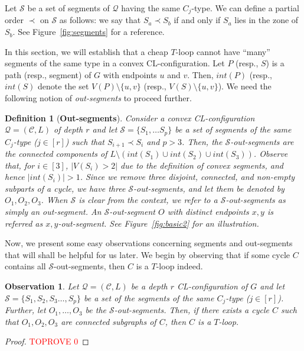 \documentclass{article}
\newtheorem{observation}[theorem]{Observation}
\newtheorem{definition}[theorem]{Definition}
\numberwithin{claimcounter}{lemma}
\begin{document}
Let $\mathcal{S}$ be a set of segments of $\mathcal{Q}$ having the same $C_j$-type. We can define a partial order $\prec$ on $\mathcal{S}$ as follows: we say that $S_a \prec S_b $ if and only if $S_a$ lies in the zone of $S_b$. See Figure~\ref{fig:segments} for a reference. 




In this section, we will establish that a cheap $T$-loop cannot have ``many'' segments of the same type in a convex CL-configuration. Let $P$ (resp., $S$) is a path (resp., segment) of $G$ with endpoints $u$ and $v$. Then, $int(P)$ (resp., $int(S)$ denote the set $V(P)\setminus\{u,v\}$ (resp., $V(S)\setminus \{u,v\}$). We need the following notion of \textit{out-segments} to proceed further.

 



\begin{definition}[{\bf Out-segments}]\label{D:OS}
    Consider a convex CL-configuration $\mathcal{Q}=(\mathcal{C},L)$ of depth $r$ and let $\mathcal{S} = \{S_1,\ldots S_p\}$ be a set of segments of the same $C_j$-type ($j\in [r]$) such that $S_{i+1} \prec S_i$ and $p >3$.  Then, the $\mathcal{S}$-out-segments are the connected components of $L\setminus(int(S_1)\cup int(S_2) \cup int(S_3))$. Observe that, for $i\in [3]$, $|V(S_i)>2|$ due to the definition of convex segments, and hence $|int(S_i)|>1$. Since we remove three disjoint, connected, and non-empty subparts of a cycle, we have three $\mathcal{S}$-out-segments, and let them be denoted by $O_1,O_2,O_3$. When $\mathcal{S}$ is clear from the context, we refer to a $\mathcal{S}$-out-segments as simply an out-segment. An $\mathcal{S}$-out-segment $O$ with distinct endpoints $x,y$ is referred as $x,y$-out-segment. See Figure~\ref{fig:basic2} for an illustration. 
\end{definition}





Now, we present some easy observations concerning segments and out-segments that will shall be helpful for us later. We begin by observing that if some cycle $C$ contains all $\mathcal{S}$-out-segments, then $C$ is a $T$-loop indeed.
\begin{observation}\label{O:three}
    Let $\mathcal{Q}=(\mathcal{C},L)$ be a depth $r$ CL-configuration of $G$ and let $\mathcal{S} = \{S_1,S_2,S_3\ldots,S_p\}$ be a set of the segments of the same $C_j$-type ($j\in [r]$). Further, let   $O_1,\ldots,O_3$ be the $\mathcal{S}$-out-segments. Then, if there exists a cycle $C$ such that $O_1,O_2,O_3$ are connected subgraphs of $C$, then $C$ is a $T$-loop.
\end{observation}
\begin{proof}\textcolor{red}{TOPROVE 0}\end{proof}
\end{document}
